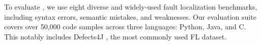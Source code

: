 


To evaluate \ourmethod{}, we use eight diverse and widely-used fault localization benchmarks, including syntax errors, semantic mistakes, and weaknesses.
Our evaluation suite covers over 50,000 %
code samples across three languages: Python, Java, and C.
This notably includes Defects4J \citep{defects4j}, the most commonly used FL dataset.


